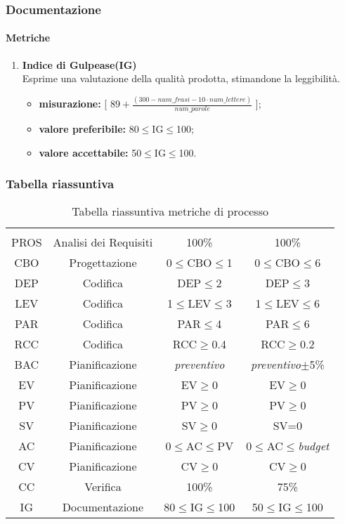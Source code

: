	\subsubsection{Documentazione}
		\paragraph{Metriche}
		\begin{enumerate}
		\item[]
			\textbf{Indice di Gulpease(IG)}\\
			Esprime una valutazione della qualità prodotta, stimandone la leggibilità.
			\begin{itemize}
				\item \textbf{misurazione:} [ $89+ \frac{(300-num\_frasi-10\cdot num\_lettere)}{num\_parole}$ ];
				\item \textbf{valore preferibile:} 80$\leq$IG$\leq$100;
				\item \textbf{valore accettabile:} 50$\leq$IG$\leq$100.
			\end{itemize}
		\end{enumerate}
\pagebreak
\subsubsection{Tabella riassuntiva}
\begin{table}[H]
	\begin{center}
				\caption{Tabella riassuntiva metriche di processo}
		\begin{tabular}{cc!{\color[HTML]{9b240a}\vrule width 0.05cm}cc}
			\rowcolorhead
			 &  &  &  \\

			PROS & Analisi dei Requisiti & 100\% & 100\%\\
			CBO & Progettazione & 0$\leq$CBO$\leq$1 & 0$\leq$CBO$\leq$6\\
			DEP & Codifica & DEP$\leq$2 & DEP$\leq$3\\
			LEV & Codifica & 1$\leq$LEV$\leq$3 & 1$\leq$LEV$\leq$6\\
			PAR & Codifica & PAR$\leq$4 & PAR$\leq$6\\
			RCC & Codifica & RCC$\geq$0.4 & RCC$\geq$0.2\\
			BAC & Pianificazione & \textit{preventivo} & \textit{preventivo}$\pm$5\%\\
			EV & Pianificazione & EV$\geq$0 & EV$\geq$0\\
			PV & Pianificazione & PV$\geq$0 & PV$\geq$0\\
			SV & Pianificazione & SV$\geq$0 & SV=0\\
			AC & Pianificazione & 0$\leq$AC$\leq$PV & 0$\leq$AC$\leq$\textit{budget}\\
			CV & Pianificazione & CV$\geq$0 & CV$\geq$0\\
			CC & Verifica & 100\% & 75\%\\
			IG & Documentazione & 80$\leq$IG$\leq$100 & 50$\leq$IG$\leq$100\\
		\end{tabular}

	\end{center}
\end{table}